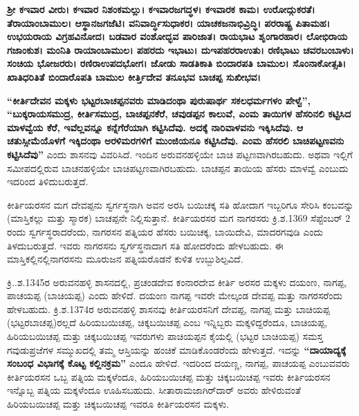 \textbf{ಶ‍್ರೀ ಕಇವಾರ ವೀರು। ಕಇವಾರ ನಿಶಂಕಮಲ್ಲು। ಕಇವಾರಜಗದ್ಧಳ। ಕಇವಾರಕ ಕಾಮ। ಉರೋದ್ಗುಕರತೆ।\general{\break } ತೆರಾಯಾಂಬಾಮುಲ। ಆಸ್ಥಾನಜಗಜೆಟಿ। ವನಿವಾರ್ದ್ಧಿಸುಧಾಕರ। ಯಾಚಕಜನಾಭಿವ್ರಿದ್ಧಿ। ಪರರಾಷ್ಟ್ರ ಪಿತಾಮಹ। ಉಭಯರಾಯ ವಿಗ್ರಹವಿನೋದ। ಬಡವಾರ ವಂಶೋದ್ಭವ ಪಾರಿಜಾತ। ರಾಯಭಾಟ ಶೃಂಗಾರಹಾರ। ಲೋಭಿರಾಯ ಗಜಾಂಕುಶ। ಮಂನಿತಿ ರಾಯಾಂಬಾಮುಲ। ಪಹರದು ಇಭಾಟು। ದುಇಪಹರರಾಉತು। ರಣಿಭಾಟು ಚವರಬಂಬಾಳು। ಸಂಚಿಯ ಭೋಜರರು। ರಣಿರಾಉಪದಭೋಗ। ಜೋಡು ಸಾಡತಿಕಾತಿ ಬಿಂದಾರಪತಿ ಬಾಮುಲ। ಸೊಂನಾಕೋತ್ಸತಿ। ಖಾತಿಧರಿತಿತೆ ಬಿಂದಾರೊಪತಿ ಬಾಮುಲ ಕೀರ್ತ್ತಿದೇವ ತನೂಭವ ಬಾಚಪ್ಪ ಸುಖೀಭವ।}

\textbf{“ಕೀರ್ತಿದೇವನ ಮಕ್ಕಳು ಭಟ್ಟರಬಾಚಪ್ಪನವರು ಮಾಡಿದಂಥಾ ಪುರುಷಾರ್ಥ ಸಕಲಧರ್ಮಗಳಂ ಪೇಳ್ವೆ”,\general{\break } “ಬುಕ್ಕರಾಯಸಮುದ್ರ, ಕೀರ್ತಿಸಮುದ್ರ, ಬಾಚಪ್ಪನಕೆರೆ, ಚವುಡಪ್ಪನ ಕಾಲುವೆ, ಎಂಮ ತಾಯಿಗಳ ಹೆಸರಿನಲಿ ಕಟ್ಟಿಸಿದ ಮಾಳವ್ವೆಯ ಕೆರೆ, ಇವೆಲ್ಲವನ್ನೂ ಕನ್ನೆಗೆರೆಯಾಗಿ ಕಟ್ಟಿಸಿದೆವು. ಅದಕ್ಕೆ ನಾರಿವಾಳವನು ಇಕ್ಕಿಸಿದೆವು. ಆ ಚತುಸ್ಸೀಮೆಯೊಳಗೆ ಇಕ್ಕಿದಂಥಾ ಅರಳಿಮರಗಳಿಗೆ ಮುಂಜಿಯನೂ ಕಟ್ಟಿಸಿದೆವು. ಎಂಮ ಹೆಸರಲಿ ಬಾಚಿಪಟ್ಟಣವನು ಕಟ್ಟಿಸಿದೆವು”} ಎಂದು ಶಾಸನವು ವಿವರಿಸಿದೆ. ಇಂದಿನ ಅರುವನಹಳ್ಳಿಯೇ ಬಾಚಿ ಪಟ್ಟಣವಾಗಿರಬಹುದು. ಅಥವಾ ಇಲ್ಲಿಗೆ ಸಮೀಪದಲ್ಲಿರುವ ಬಾಚನಹಳ್ಳಿಯೇ ಬಾಚಿಪಟ್ಟಣವಾಗಿರಬಹುದು. ಬಾಚಪ್ಪನ ತಾಯಿಯ ಹೆಸರು ಮಾಳವ್ವೆ ಎಂಬುದು ಇದರಿಂದ ತಿಳಿದುಬರುತ್ತದೆ.

ಕೀರ್ತಿಯರಸನ ಮಗ ದೇವಪ್ಪನು ಸ್ವರ್ಗಸ್ಥನಾಗಿ ಅವನ ಅರಸಿ ಬಯಿಚಕ್ಕ ಸತಿ ಹೋದಾಗ ಇಬ್ಬರಿಗೂ ಸೇರಿಸಿ ಕಂಬವನ್ನು (ಮಾಸ್ತಿಕಲ್ಲು ಮತ್ತು ಸ್ಮಾರಕ) ಬಾಚಪ್ಪನೇ ನಿಲ್ಲಿಸುತ್ತಾನೆ. ಕೀರ್ತಿಯರಸರ ಮಗ ನಾಗರಸರು ಕ್ರಿ.ಶ.1369 ಸೆಪ್ಟೆಂಬರ್​ 2 ರಂದು ಸ್ವರ್ಗಸ್ಥರಾದರೆಂದು, ನಾಗರಸನ ಪತ್ನಿಯರ ಹೆಸರು ಬಯಿಚಕ್ಕ, ಬಾಯಿದೇವಿ, ಮಾದರಗವುಡಿ ಎಂದು ತಿಳದುಬರುತ್ತದೆ. ಇವರು ನಾಗರಸನು ಸ್ವರ್ಗಸ್ಥನಾದಾಗ ಸತಿ ಹೋದರೆಂದು ಹೇಳಬಹುದು. ಈ ಮಾಸ್ತಿಕಲ್ಲಿನಲ್ಲಿ\break ನಾಗರಸನು ಮೂರುಜನ ಪತ್ನಿಯರೊಡನೆ ಕುಳಿತ ಉಬ್ಬುಶಿಲ್ಪವಿದೆ.

ಕ್ರಿ..ಶ.1345ರ ಅರುವನಹಳ್ಳಿ ಶಾಸನದಲ್ಲಿ, ಪ್ರಚಂಡದೇವ ಕಂನಾರದೇವ ಕೀರ್ತಿ ಅರಸರ ಮಕ್ಕಳು ದಯಂಣ, ನಾಗಪ್ಪ, ಪಾಚಯಪ್ಪ (ಬಾಚಿಯಪ್ಪ) ಎಂದು ಹೇಳಿದೆ. ದಯಂಣ ನಾಗಪ್ಪ ಇವರೇ ಮೇಲ್ಕಂಡ ದೇವಪ್ಪ ಮತ್ತು ನಾಗರಸರೆಂದು ಹೇಳಬಹುದು. ಕ್ರಿ.ಶ.1374ರ ಅರುವನಹಳ್ಳಿ ಶಾಸನವು ಕೀರ್ತಿಯರಸನಿಗೆ ದೇವಪ್ಪ, ನಾಗಪ್ಪ ಮತ್ತು ಬಾಚಿಯಪ್ಪ (ಭಟ್ಟರಬಾಚಪ್ಪ)ರಲ್ಲದೆ ಹಿರಿಯಬಯಿಚಪ್ಪ, ಚಿಕ್ಕಬಯಿಚಪ್ಪ ಎಂಬ ಇನ್ನಿಬ್ಬರು ಮಕ್ಕಳಿದ್ದರೆಂದೂ, ಬಾಚಿಯಪ್ಪ, ಹಿರಿಯಬಯಿಚಪ್ಪ ಮತ್ತು ಚಿಕ್ಕಬಯಿಚಪ್ಪ ಇವರುಗಳು ಪಾಚಿಯಪ್ಪನ ಕೈಯಲ್ಲಿ (ಭಟ್ಟರ ಬಾಚಿಯಪ್ಪ) ಸಮಸ್ತ ಗವುಡುಪ್ರಜೆಗಳ ಸಮ್ಮುಖದಲ್ಲಿ ತಮ್ಮ ಆಸ್ತಿಯನ್ನು ಹಂಚಿಕೆ ಮಾಡಿಕೊಂಡರೆಂದು ಹೇಳುತ್ತದೆ. ಇದನ್ನು \textbf{“ದಾಯಾದ್ಯಕ್ಕೆ ಸಂಬಂಧ ವಿಭಾಗಕ್ಕೆ ಕೊಟ್ಟ ಕಲ್ಲಿನಕ್ರಮ”} ಎಂದೂ ಹೇಳಿದೆ. ಇದರಿಂದ ದಯಣ್ಣ, ನಾಗಪ್ಪ, ಪಾಚಯಪ್ಪ ಎಂಬುವವರು ಕೀರ್ತಿಯರಸನ ಒಬ್ಬ ಪತ್ನಿಯ ಮಕ್ಕಳೆಂದೂ, ಹಿರಿಯಬಯಿಚಪ್ಪ ಮತ್ತು ಚಿಕ್ಕಬಯಿಚಪ್ಪ ಇವರು ಕೀರ್ತಿಯರಸನ ಇನ್ನೊಬ್ಬ ಪತ್ನಿಯ ಮಕ್ಕಳೆಂದೂ ಊಹಿಸಬಹುದು. ಸೀತಾರಾಮಜಾಗಿರ್​ದಾರ್​ ಅವರು ಹೇಳಿರುವಂತೆ ಹಿರಿಯಬಯಿಚಪ್ಪ ಮತ್ತು ಚಿಕ್ಕಬಯಿಚಪ್ಪ ಇವರೂ ಕೀರ್ತಿಯರಸನ ಮಕ್ಕಳು.

